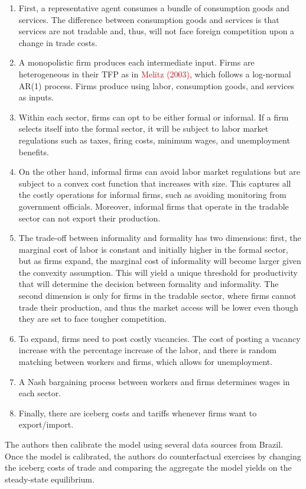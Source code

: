 \documentclass[12pt,oneside,reqno]{amsart}
\begin{document}
\begin{enumerate}[label=\arabic*.]
    \item First, a representative agent consumes a bundle of consumption goods and services. The difference between consumption goods and services is that services are not tradable and, thus, will not face foreign competition upon a change in trade costs.
    \item A monopolistic firm produces each intermediate input. Firms are heterogeneous in their TFP as in \textcolor{red}{Melitz (2003)}, which follows a log-normal AR(1) process. Firms produce using labor, consumption goods, and services as inputs.
    \item Within each sector, firms can opt to be either formal or informal. If a firm selects itself into the formal sector, it will be subject to labor market regulations such as taxes, firing costs, minimum wages, and unemployment benefits.
    \item On the other hand, informal firms can avoid labor market regulations but are subject to a convex cost function that increases with size. This captures all the costly operations for informal firms, such as avoiding monitoring from government officials. Moreover, informal firms that operate in the tradable sector can not export their production.
    \item The trade-off between informality and formality has two dimensions: first, the marginal cost of labor is constant and initially higher in the formal sector, but as firms expand, the marginal cost of informality will become larger given the convexity assumption. This will yield a unique threshold for productivity that will determine the decision between formality and informality. The second dimension is only for firms in the tradable sector, where firms cannot trade their production, and thus the market access will be lower even though they are set to face tougher competition.
    \item  To expand, firms need to post costly vacancies. The cost of posting a vacancy increase with the percentage increase of the labor, and there is random matching between workers and firms, which allows for unemployment. 
    \item A Nash bargaining process between workers and firms determines wages in each sector. 
    \item Finally, there are iceberg costs and tariffs whenever firms want to export/import. 
\end{enumerate}
The authors then calibrate the model using several data sources from Brazil. Once the model is calibrated, the authors do counterfactual exercises by changing the iceberg costs of trade and comparing the aggregate the model yields on the steady-state equilibrium. 
\end{document}

